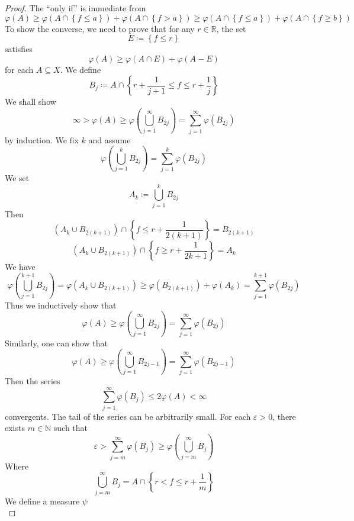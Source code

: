 \documentclass[../main.tex]{subfiles}
\begin{document}
\begin{proof}
    The ``only if'' is immediate from \[
     \varphi \left( A \right)\ge  \varphi \left( A\cap \left\{ f\le a \right\} \right)+  \varphi \left( A\cap \left\{ f> a \right\} \right)\ge  \varphi \left( A\cap \left\{ f\le a \right\} \right)+  \varphi \left( A\cap \left\{ f\ge b \right\} \right)     
    \]
    To show the converse, we need to prove that for any \(  r \in \mathbb{R}   \), the set  \[
    E\coloneqq  \left\{ f\le r \right\}
    \] satisfies \[
     \varphi \left( A \right)\ge  \varphi \left( A\cap E \right)+  \varphi \left( A-E \right)   
    \] for each \(  A\subseteq X  \). We define \[
    B_{j}\coloneqq A\cap \left\{ r+   \frac{1 }{j + 1 }\le f\le r+  \frac{1 }{j }   \right\}
    \] We shall show \[
    \infty>  \varphi \left( A \right)\ge  \varphi \left( \bigcup _{j= 1}^{\infty}B_{2j} \right)=   \sum _{j= 1}^{\infty} \varphi \left( B_{2j} \right)  
    \]by induction. We fix \(  k  \) and assume \[
     \varphi \left( \bigcup _{j= 1}^{k}B_{2j} \right)= \sum _{j= 1}^{k} \varphi \left( B_{2j} \right)  
    \] We set \[
    A_{k}\coloneqq \bigcup _{j= 1}^{k}B_{2j}
    \] Then \[
    \left( A_{k}\cup B_{2\left( k+ 1 \right) } \right)\cap \left\{ f\le r+ \frac{1 }{2\left( k+ 1 \right)  }  \right\} = B_{2\left( k+ 1 \right) }
    \] \[
    \left( A_{k}\cup B_{2\left( k+ 1 \right) } \right)\cap \left\{ f\ge r+ \frac{1 }{2k+ 1 }  \right\} = A_{k}
    \]We have \[
     \varphi \left( \bigcup _{j= 1}^{k+ 1}B_{2j} \right)=   \varphi \left( A_{k}\cup B_{2\left( k+ 1 \right) } \right) \ge  \varphi \left( B_{2\left( k+ 1 \right) } \right) +  \varphi \left( A_{k} \right)= \sum _{j= 1}^{k+ 1} \varphi \left( B_{2j} \right)  
    \] Thus we inductively show that \[
    \varphi \left( A \right)\ge    \varphi \left( \bigcup _{j= 1}^{\infty}B_{2j} \right)= \sum _{j= 1}^{\infty} \varphi \left( B_{2j} \right)  
    \] Similarly, one can show that \[
    \varphi \left( A \right)\ge    \varphi \left( \bigcup _{j= 1}^{\infty}B_{2j-1} \right)= \sum _{j= 1}^{\infty} \varphi \left( B_{2j-1} \right)  
    \] Then the series \[
    \sum _{j= 1}^{\infty} \varphi \left( B_{j} \right)\le  2 \varphi \left( A \right)< \infty  
    \]convergents. The tail of the series can be arbitrarily small. For each \(   \varepsilon > 0  \), there exists \(  m \in \mathbb{N}   \) such that \[
     \varepsilon > \sum _{j= m}^{\infty} \varphi \left( B_{j} \right)\ge  \varphi \left( \bigcup _{j= m}^{\infty}B_{j} \right)  
    \]Where \[
    \bigcup _{j = m}^{\infty}B_{j}=  A\cap \left\{ r< f\le r+ \frac{1 }{m }  \right\}
    \] We define a measure \(  \psi   \) \[
\]
\end{proof}
\end{document}
